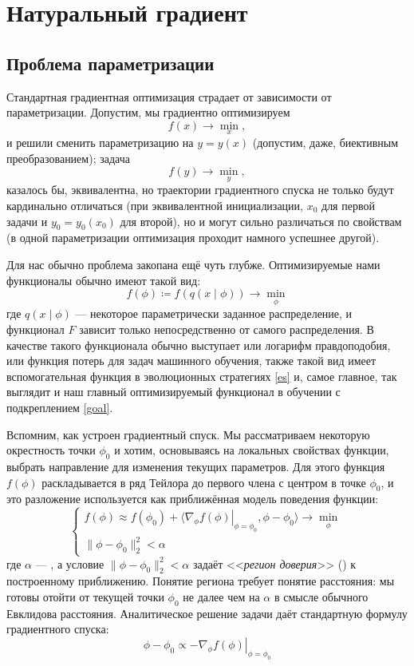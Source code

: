 \section{Натуральный градиент}\label{appendix:ng}

\subsection{Проблема параметризации}

Стандартная градиентная оптимизация страдает от зависимости от параметризации. Допустим, мы градиентно оптимизируем
$$f(x) \to \min_x ,$$
и решили сменить параметризацию на $y = y(x)$ (допустим, даже, биективным преобразованием); задача
$$f(y) \to \min_y ,$$
казалось бы, эквивалентна, но траектории градиентного спуска не только будут кардинально отличаться (при эквивалентной инициализации, $x_0$ для первой задачи и $y_0 = y_0(x_0)$ для второй), но и могут сильно различаться по свойствам (в одной параметризации оптимизация проходит намного успешнее другой).

Для нас обычно проблема закопана ещё чуть глубже. Оптимизируемые нами функционалы обычно имеют такой вид:
\begin{equation}\label{NGmotivation}
f(\phi) \coloneqq f(q(x \mid \phi)) \to \min_\phi
\end{equation}
где $q(x \mid \phi)$ --- некоторое параметрически заданное распределение, и функционал $F$ зависит только непосредственно от самого распределения. В качестве такого функционала обычно выступает или логарифм правдоподобия, или функция потерь для задач машинного обучения, также такой вид имеет вспомогательная функция в эволюционных стратегиях \eqref{es} и, самое главное, так выглядит и наш главный оптимизируемый функционал в обучении с подкреплением \eqref{goal}.

Вспомним, как устроен градиентный спуск. Мы рассматриваем некоторую окрестность точки $\phi_0$ и хотим, основываясь на локальных свойствах функции, выбрать направление для изменения текущих параметров. Для этого функция $f(\phi)$ раскладывается в ряд Тейлора до первого члена с центром в точке $\phi_0$, и это разложение используется как приближённая модель поведения функции:
$$\begin{cases}
f(\phi) \approx f(\phi_0) + \langle \left. \nabla_\phi f(\phi) \right|_{\phi = \phi_0}, \phi - \phi_0 \rangle \to \min\limits_{\phi} \\
\|\phi - \phi_0\|_2^2 < \alpha
\end{cases}$$
где $\alpha$ --- , а условие $\|\phi - \phi_0\|_2^2 < \alpha$ задаёт <<\emph{регион доверия}>> () к построенному приближению. Понятие региона требует понятие расстояния: мы готовы отойти от текущей точки $\phi_0$ не далее чем на $\alpha$ в смысле обычного Евклидова расстояния. Аналитическое решение задачи даёт стандартную формулу градиентного спуска:
$$\phi - \phi_0 \propto - \left. \nabla_\phi f(\phi) \right|_{\phi = \phi_0}$$

